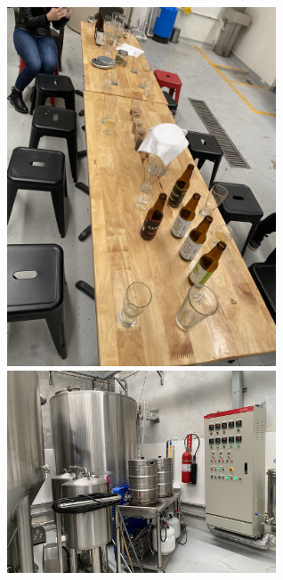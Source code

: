 \documentclass{article}
\begin{document}
\begin{figure}[htbp]
    \includegraphics[width=8cm]{./img/IMG-7098.JPG}
    \includegraphics[width=8cm]{./img/IMG-7099.JPG}
    \caption{}
    \label{}
\end{figure}
\end{document}
